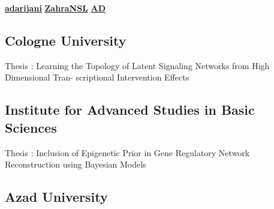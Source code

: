 \documentclass[a4paper]{MagicalCV}
\begin{document}
\lastupdated

  \href{https://github.com/adarijani}{\bf adarijani} 
 \href{https://github.com/ZahraNSL}{\bf ZahraNSL}
 \href{https://www.linkedin.com/in/zahra-hs-nasrollah-439064a2/}{\bf AD}


\begin{minipage}[t]{0.33\textwidth} 


\subsection{Cologne University}
\vspace{\topsep} %
\begin{tightemize}
\item Thesis : Learning the Topology of Latent Signaling Networks from High Dimensional Tran-
scriptional Intervention Effects
\end{tightemize}
\sectionsep

\subsection{Institute for Advanced Studies in Basic Sciences}
\begin{tightemize}
\item Thesis : Inclusion of Epigenetic Prior in Gene Regulatory Network Reconstruction using
Bayesian Models
\end{tightemize}
\sectionsep

\subsection{Azad University}
\begin{tightemize}
\end{tightemize}
\sectionsep



\end{minipage}
\end{document}
